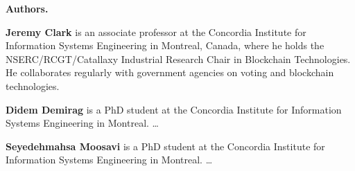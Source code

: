 \documentclass[acmlarge,screen]{acmart}
\begin{document}
\begin{Sidebar*}[h!]
\begin{framed}
\begin{flushleft}
\textbf{Authors.} \newline

\textbf{Jeremy Clark} is an associate professor at the Concordia Institute for Information Systems Engineering in Montreal, Canada, where he holds the NSERC/RCGT/Catallaxy Industrial Research Chair in Blockchain Technologies. He collaborates regularly with government agencies on voting and blockchain technologies. \newline

\textbf{Didem Demirag} is a PhD student at the Concordia Institute for Information Systems Engineering in Montreal. \ldots \newline

\textbf{Seyedehmahsa Moosavi} is a PhD student at the Concordia Institute for Information Systems Engineering in Montreal. \ldots \newline

\end{flushleft}
\end{framed}
\end{Sidebar*}



\end{document}
